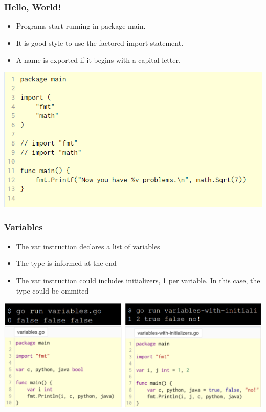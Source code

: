 \documentclass[14pt]{beamer}
\begin{document}
{
\begin{frame}
    \frametitle{Hello, World!}
    \begin{itemize}
        \item Programs start running in package main.
        \item It is good style to use the factored import statement.
        \item A name is exported if it begins with a capital letter.
    \end{itemize}
    \begin{center}
        \includegraphics[width=0.7\linewidth]{img/introtogo.PNG}
    \end{center}
\end{frame}
}

{
\begin{frame}
    \frametitle{Variables}
    \begin{itemize}
        \item The var instruction declares a list of variables
        \item The type is informed at the end
        \item The var instruction could includes initializers, 1 per variable. In this case, the type could be ommited
    \end{itemize}
    \begin{center}
        \includegraphics[width=\linewidth]{img/variables.PNG}
    \end{center}
\end{frame}
}
\end{document}
